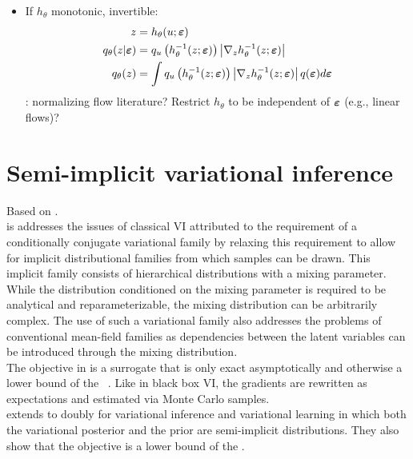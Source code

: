 \documentclass[10pt]{article}
\begin{document}
\begin{itemize}

\item
If $h_\theta$ monotonic, invertible:
\begin{align*}
z &= h_\theta(u;\bm{\varepsilon}) \\
q_\theta(z|\bm{\varepsilon}) &= q_u\left(h_\theta^{-1}(z;\bm{\varepsilon})\right)\left|\nabla_zh_\theta^{-1}(z;\bm{\varepsilon})\right| \\
q_\theta(z) &= \int q_u\left(h_\theta^{-1}(z;\bm{\varepsilon})\right)\left|\nabla_zh_\theta^{-1}(z;\bm{\varepsilon})\right| q(\bm{\varepsilon})d\bm{\varepsilon}
\end{align*}
\todo: normalizing flow literature? Restrict $h_\theta$ to be independent of $\bm{\varepsilon}$ (e.g., linear flows)?

\end{itemize}


\newpage


\section{Semi-implicit variational inference}

Based on \citet{Yin:2018}.
\\

\sivi is addresses the issues of classical VI attributed to the requirement of a conditionally conjugate variational family by relaxing this requirement to allow for implicit distributional families from which samples can be drawn. This implicit family consists of hierarchical distributions with a mixing parameter. While the distribution conditioned on the mixing parameter is required to be analytical and reparameterizable, the mixing distribution can be arbitrarily complex. The use of such a variational family also addresses the problems of conventional mean-field families as dependencies between the latent variables can be introduced through the mixing distribution.
\\

The objective in \sivi is a surrogate \elbo that is only exact asymptotically and otherwise a lower bound of the \elbo~\citep{Molchanov:2019}. Like in black box VI, the gradients are rewritten as expectations and estimated via Monte Carlo samples.
\\

\citet{Molchanov:2019} extends \sivi to doubly \sivi for variational inference and variational learning in which both the variational posterior and the prior are semi-implicit distributions. They also show that the \sivi objective is a lower bound of the \elbo.
\\
\end{document}
